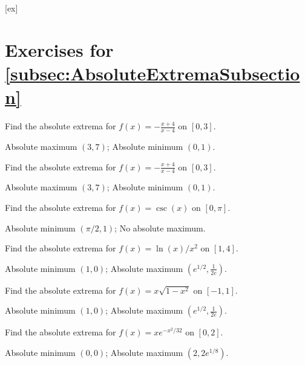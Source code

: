 [ex]
\section*{Exercises for \ref{subsec:AbsoluteExtremaSubsection}}

\begin{enumialphparenastyle}

\begin{ex}
	Find the absolute extrema for $f(x)=-\frac{x+4}{x-4}$ on $[0,3]$.
	\begin{sol}
		Absolute maximum $(3,7)$; Absolute minimum $(0,1)$. 
	\end{sol}
\end{ex}

\begin{ex}
	Find the absolute extrema for $f(x)=-\frac{x+4}{x-4}$ on $[0,3]$.
	\begin{sol}
		Absolute maximum $(3,7)$; Absolute minimum $(0,1)$. 
	\end{sol}
\end{ex}

\begin{ex}
	Find the absolute extrema for $f(x)=\csc(x)$ on $[0,\pi]$.
	\begin{sol}
		Absolute minimum $(\pi/2,1)$; No absolute maximum.
	\end{sol}
\end{ex}

\begin{ex}
	Find the absolute extrema for $f(x)=\ln(x)/x^2$ on $[1,4]$.
	\begin{sol}
		Absolute minimum $(1,0)$; Absolute maximum $(e^{1/2},\frac{1}{2e})$.
	\end{sol}
\end{ex}

\begin{ex}
	Find the absolute extrema for $f(x)=x\sqrt{1-x^2}$ on $[-1,1]$.
	\begin{sol}
		Absolute minimum $(1,0)$; Absolute maximum $(e^{1/2},\frac{1}{2e})$.
	\end{sol}
\end{ex}

\begin{ex}
	Find the absolute extrema for $f(x)=xe^{-x^2/32}$ on $[0,2]$.
	\begin{sol}
		Absolute minimum $(0,0)$; Absolute maximum $(2,2e^{1/8})$.
	\end{sol}
\end{ex}


\end{enumialphparenastyle}
